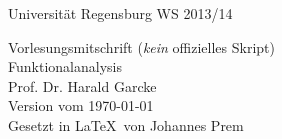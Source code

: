\begin{titlepage}
    \Large
        Universität Regensburg \hfill WS 2013/14 \\
    \vspace{4cm}
    \begin{center}
        \small
        Vorlesungsmitschrift (\emph{kein} offizielles Skript)\\[1cm]
        \Huge 
            Funktionalanalysis\\[2cm]
        \Large
            Prof. Dr. Harald Garcke\\
        \vfill
        \small
            Version vom \today \\[0.8cm]
            Gesetzt in \LaTeX\ von Johannes Prem
        \vspace*{3cm}
    \end{center}
\end{titlepage}

